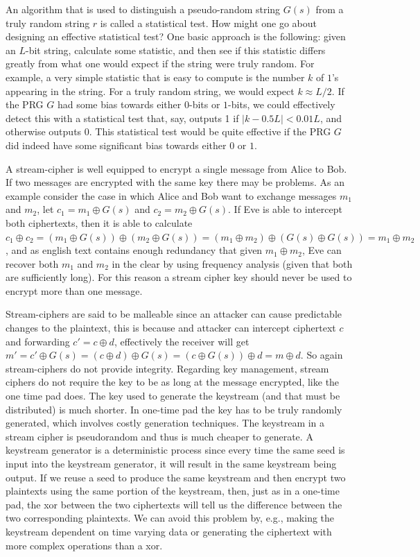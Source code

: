 An algorithm that is used to distinguish a pseudo-random string $G(s)$ from a truly random string $r$ is called a statistical test. How might one go about designing an effective statistical test? One basic approach is the following: given an $L$-bit string, calculate some statistic, and then see if this statistic differs greatly from what one would expect if the string were truly random.
For example, a very simple statistic that is easy to compute is the number $k$ of $1$'s appearing in the string. For a truly random string, we would expect $k \approx L/2$. If the PRG $G$ had some bias towards either $0$-bits or $1$-bits, we could effectively detect this with a statistical test that, say, outputs 1 if $|k - 0.5L| < 0.01L$, and otherwise outputs 0. This statistical test would be quite effective if the PRG $G$ did indeed have some significant bias towards either $0$ or $1$.

A stream-cipher is well equipped to encrypt a single message from Alice to Bob. If two messages are encrypted with the same key there may be problems. As an example consider the case in which Alice and Bob want to exchange messages $m_1$ and $m_2$, let $c_1 = m_1 \oplus G(s)$ and $c_2 = m_2 \oplus G(s)$. If Eve is able to intercept both ciphertexts, then it is able to calculate $c_1 \oplus c_2 = ( m_1 \oplus G(s)) \oplus (m_2 \oplus G(s)) = (m_1 \oplus m_2) \oplus (G(s) \oplus G(s)) = m_1 \oplus m_2$, and as english text contains enough redundancy that given $m_1 \oplus m_2$, Eve can recover both $m_1$ and $m_2$ in the clear by using frequency analysis (given that both are sufficiently long). For this reason a stream cipher key should never be used to encrypt more than one message.

Stream-ciphers are said to be malleable since an attacker can cause predictable changes to the plaintext, this is because and attacker can intercept ciphertext $c$ and forwarding $c'=c \oplus d$, effectively the receiver will get $m' = c' \oplus G(s)= (c \oplus d) \oplus G(s) = (c \oplus G(s)) \oplus d = m \oplus d$. So again stream-ciphers do not provide integrity.
Regarding key management, stream ciphers do not require the key to be as long at the message encrypted, like the one time pad does. The key used to generate the keystream (and that must be distributed) is much shorter. In one-time pad the key has to be truly randomly generated, which involves costly generation techniques. The keystream in a stream cipher is pseudorandom and thus is much cheaper to generate. A keystream generator is a deterministic process since every time the same seed is input into the keystream generator, it will result in the same keystream being output. If we reuse a seed to produce the same keystream and then encrypt two plaintexts using the same portion of the keystream, then, just as in a one-time pad, the xor between the two ciphertexts will tell us the difference between the two corresponding plaintexts. We can avoid this problem by, e.g., making the keystream dependent on time varying data or generating the ciphertext with more complex operations than a xor.

